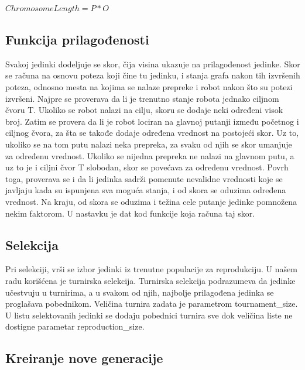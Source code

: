 \documentclass[12pt]{article}
\begin{document}
	$ ChromosomeLength =  P * O $  \newline
	
	
	\subsection{Funkcija prilagođenosti}
	\label{sec:drugoPoglavlje}
	Svakoj jedinki dodeljuje se skor, čija visina ukazuje na prilagođenost jedinke. Skor se računa na osnovu poteza koji čine tu jedinku, i stanja grafa nakon tih izvršenih poteza, odnosno mesta na kojima se nalaze prepreke i robot nakon što su potezi izvršeni. Najpre se proverava da li je trenutno stanje robota jednako ciljnom čvoru T. Ukoliko se robot nalazi na cilju, skoru se dodaje neki određeni visok broj. Zatim se provera da li je robot lociran na glavnoj putanji između početnog i ciljnog čvora, za šta se takođe dodaje određena vrednost na postojeći skor. Uz to, ukoliko se na tom putu nalazi neka prepreka, za svaku od njih se skor umanjuje za određenu vrednost. Ukoliko se nijedna prepreka ne nalazi na glavnom putu, a uz to je i ciljni čvor T slobodan, skor se povećava za određenu vrednost. Povrh toga, proverava se i da li jedinka sadrži pomenute nevalidne vrednosti koje se javljaju kada su ispunjena sva moguća stanja, i od skora se oduzima određena vrednost. Na kraju, od skora se oduzima i težina cele putanje jedinke pomnožena nekim faktorom. U nastavku je dat kod funkcije koja računa taj skor.
	\vspace*{1\baselineskip}
	
	
	\subsection{Selekcija}	
	Pri selekciji, vrši se izbor jedinki iz trenutne populacije za reprodukciju. U našem radu korišćena je turnirska selekcija. Turnirska selekcija podrazumeva da jedinke učestvuju u turnirima, a u svakom od njih, najbolje prilagođena jedinka se proglašava pobednikom. Veličina turnira zadata je parametrom tournament\_size. U listu selektovanih jedinki se dodaju pobednici turnira sve dok veličina liste ne dostigne parametar reproduction\_size. 
	\vspace*{1\baselineskip}
	
	
	
	\subsection{Kreiranje nove generacije}	
	\label{sec:trecePoglavlje}
	
\end{document}
